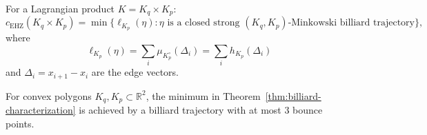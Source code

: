 \begin{unverified}
\begin{theorem}%
\label{thm:billiard-characterization}
For a Lagrangian product $K = K_q \times K_p$:
\[
  c_{\mathrm{EHZ}}(K_q \times K_p)
  = \min\bigl\{ \ell_{K_p}(\eta) :
  \eta \text{ is a closed strong $(K_q,K_p)$-Minkowski billiard trajectory}
  \bigr\},
\]
where
\[
  \ell_{K_p}(\eta)
  = \sum_i \mu_{K_p^\circ}(\Delta_i)
  = \sum_i h_{K_p}(\Delta_i)
\]
and $\Delta_i=x_{i+1}-x_i$ are the edge vectors.
\end{theorem}
\end{unverified}


\begin{unverified}
\begin{theorem}%
\label{thm:bounce-bound}
For convex polygons $K_q, K_p \subset \mathbb{R}^2$,
the minimum in Theorem~\ref{thm:billiard-characterization}
is achieved by a billiard trajectory with at most $3$ bounce points.
\end{theorem}
\end{unverified}


